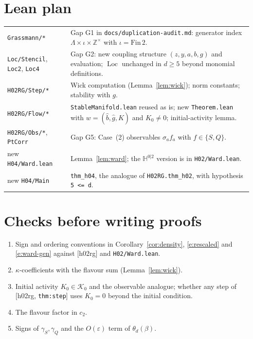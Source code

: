 \documentclass[11pt]{article}
\theoremstyle{remark}
\theoremstyle{definition}
\newcommand{\HH}{\mathbb{H}}
\newcommand{\Z}{\mathbb{Z}}
\newcommand{\Loc}{\operatorname{Loc}}
\newcommand{\hr}[1]{\textup{[h02rg, \texttt{#1}]}}
\begin{document}
\section{Lean plan}
\begin{tabular}{p{}p{}}
\texttt{Grassmann/*} & Gap G1 in \texttt{docs/duplication-audit.md}: generator index $\Lambda\times\iota\times\Z^\times$ with $\iota=\mathrm{Fin}\,2$.\\
\texttt{Loc/Stencil}, \texttt{Loc2}, \texttt{Loc4} & Gap G2: new coupling structure $(z,y,a,b,g)$ and evaluation; $\Loc$ unchanged in $d\ge5$ beyond monomial definitions.\\
\texttt{H02RG/Step/*} & Wick computation (Lemma~\ref{lem:wick}); norm constants; stability with $g$.\\
\texttt{H02RG/Flow/*} & \texttt{StableManifold.lean} reused as is; new \texttt{Theorem.lean} with $w=(\hat b,\hat g,K)$ and $K_0\neq0$; initial-activity lemma.\\
\texttt{H02RG/Obs/*}, \texttt{PtCorr} & Gap G5: Case~(2) observables $\sigma_af_a$ with $f\in\{S,Q\}$.\\
new \texttt{H04/Ward.lean} & Lemma~\ref{lem:ward}; the $\HH^{0|2}$ version is in \texttt{H02/Ward.lean}.\\
new \texttt{H04/Main} & \texttt{thm\_h04}, the analogue of \texttt{H02RG.thm\_h02}, with hypothesis \texttt{5 <= d}.
\end{tabular}

\section{Checks before writing proofs}
\begin{enumerate}
\item Sign and ordering conventions in Corollary~\ref{cor:density}, \eqref{e:rescaled} and \eqref{e:ward-gen} against [h02rg] and \texttt{H02/Ward.lean}.
\item $\kappa$-coefficients with the flavour sum (Lemma~\ref{lem:wick}).
\item Initial activity $K_0\in\mathcal K_0$ and the observable analogue; whether any step of \hr{thm:step} uses $K_0=0$ beyond the initial condition.
\item The flavour factor in $c_2$.
\item Signs of $\gamma_S,\gamma_Q$ and the $O(\varepsilon)$ term of $\theta_d(\beta)$.
\end{enumerate}
\end{document}
